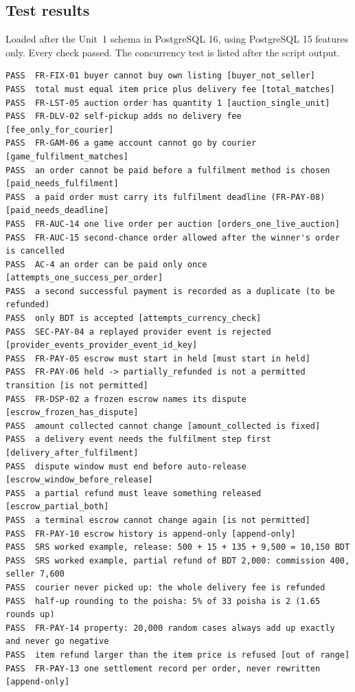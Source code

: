 \documentclass[11pt,a4paper]{article}
\begin{document}
\subsection{Test results}
\label{app:tests}
Loaded after the Unit~1 schema in PostgreSQL 16, using PostgreSQL 15 features only. Every check passed. The concurrency test is listed after the script output.
{\scriptsize
\begin{verbatim}
PASS  FR-FIX-01 buyer cannot buy own listing [buyer_not_seller]
PASS  total must equal item price plus delivery fee [total_matches]
PASS  FR-LST-05 auction order has quantity 1 [auction_single_unit]
PASS  FR-DLV-02 self-pickup adds no delivery fee [fee_only_for_courier]
PASS  FR-GAM-06 a game account cannot go by courier [game_fulfilment_matches]
PASS  an order cannot be paid before a fulfilment method is chosen [paid_needs_fulfilment]
PASS  a paid order must carry its fulfilment deadline (FR-PAY-08) [paid_needs_deadline]
PASS  FR-AUC-14 one live order per auction [orders_one_live_auction]
PASS  FR-AUC-15 second-chance order allowed after the winner's order is cancelled
PASS  AC-4 an order can be paid only once [attempts_one_success_per_order]
PASS  a second successful payment is recorded as a duplicate (to be refunded)
PASS  only BDT is accepted [attempts_currency_check]
PASS  SEC-PAY-04 a replayed provider event is rejected [provider_events_provider_event_id_key]
PASS  FR-PAY-05 escrow must start in held [must start in held]
PASS  FR-PAY-06 held -> partially_refunded is not a permitted transition [is not permitted]
PASS  FR-DSP-02 a frozen escrow names its dispute [escrow_frozen_has_dispute]
PASS  amount collected cannot change [amount_collected is fixed]
PASS  a delivery event needs the fulfilment step first [delivery_after_fulfilment]
PASS  dispute window must end before auto-release [escrow_window_before_release]
PASS  a partial refund must leave something released [escrow_partial_both]
PASS  a terminal escrow cannot change again [is not permitted]
PASS  FR-PAY-10 escrow history is append-only [append-only]
PASS  SRS worked example, release: 500 + 15 + 135 + 9,500 = 10,150 BDT
PASS  SRS worked example, partial refund of BDT 2,000: commission 400, seller 7,600
PASS  courier never picked up: the whole delivery fee is refunded
PASS  half-up rounding to the poisha: 5% of 33 poisha is 2 (1.65 rounds up)
PASS  FR-PAY-14 property: 20,000 random cases always add up exactly and never go negative
PASS  item refund larger than the item price is refused [out of range]
PASS  FR-PAY-13 one settlement record per order, never rewritten [append-only]

\end{verbatim}}
\end{document}

